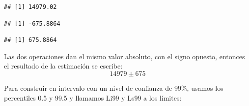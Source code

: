 \documentclass[]{book}
\newenvironment{Shaded}{\begin{snugshade}}{\end{snugshade}}
\newcommand{\DecValTok}[1]{\textcolor[rgb]{0.00,0.00,0.81}{#1}}
\newcommand{\KeywordTok}[1]{\textcolor[rgb]{0.13,0.29,0.53}{\textbf{#1}}}
\newcommand{\NormalTok}[1]{#1}
\newcommand{\OperatorTok}[1]{\textcolor[rgb]{0.81,0.36,0.00}{\textbf{#1}}}
\newcommand{\StringTok}[1]{\textcolor[rgb]{0.31,0.60,0.02}{#1}}
\begin{document}
\begin{verbatim}
## [1] 14979.02
\end{verbatim}

\begin{Shaded}
\end{Shaded}

\begin{verbatim}
## [1] -675.8864
\end{verbatim}

\begin{Shaded}
\end{Shaded}

\begin{verbatim}
## [1] 675.8864
\end{verbatim}

Las dos operaciones dan el mismo valor absoluto, con el signo opuesto, entonces el resultado de la estimación se escribe: \[14979 \pm 675\]

Para construir en intervalo con un nivel de confianza de 99\%, usamos los percentiles 0.5 y 99.5 y llamamos Li99 y Ls99 a los límites:

\begin{Shaded}
\end{Shaded}
\end{document}
